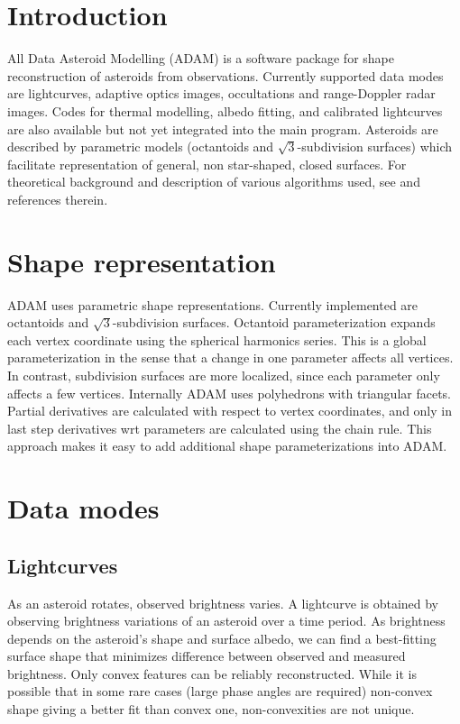 \documentclass{article}
\begin{document}
\section{Introduction}
All Data Asteroid Modelling (ADAM) is a software package for shape reconstruction of asteroids from observations. Currently supported data modes are lightcurves, adaptive optics images, occultations and range-Doppler radar images. Codes for thermal modelling, albedo fitting, and calibrated lightcurves are also available but not yet integrated into the main program.
Asteroids are described by parametric models (octantoids and $\sqrt{3}$-subdivision surfaces) which facilitate representation of general, non star-shaped, closed surfaces. 
For theoretical background and description of various algorithms used, see \cite{V16} and references therein.
\section{Shape representation}
ADAM uses parametric shape representations. Currently implemented are octantoids and $\sqrt{3}$-subdivision surfaces. Octantoid parameterization expands each vertex coordinate using the spherical harmonics series. This is a global parameterization in the sense that a change in one parameter affects all vertices. In contrast, subdivision surfaces are more localized, since each parameter only affects a few vertices.  
Internally ADAM uses polyhedrons with triangular facets. Partial derivatives are calculated with respect to vertex coordinates, and only in last step derivatives wrt parameters are calculated using the chain rule. This approach makes it easy to add additional shape parameterizations into ADAM. 

\section{Data modes}
\subsection{Lightcurves}
As an asteroid rotates, observed brightness varies. A lightcurve is obtained by observing brightness variations of an asteroid over a time period. As brightness depends on the asteroid's shape and surface albedo, we can find a best-fitting surface shape that minimizes  difference between observed  and measured brightness. 
Only convex features can be reliably reconstructed. While it is possible that in some rare cases (large phase angles are required) non-convex shape giving a better fit than convex one, non-convexities are not unique. 
\end{document}
